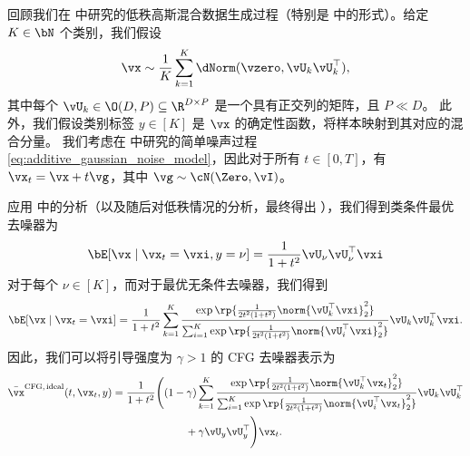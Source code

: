 \documentclass[../../book-main_zh.tex]{subfiles}
\begin{document}
\begin{example}\label{example:denoising-gaussian-mixture-cfg}
    回顾我们在  中研究的低秩高斯混合数据生成过程（特别是  中的形式）。给定 $K \in \bN$ 个类别，我们假设
    \begin{equation}\label{eq:MoG1-ch6}
        \vx \sim \frac{1}{K}\sum_{k = 1}^{K}\dNorm(\vzero,
        \vU_{k}\vU_{k}^{\top}),
    \end{equation}
    其中每个 \(\vU_{k} \in \O(D, P) \subseteq \R^{D \times P}\) 是一个具有正交列的矩阵，且 $P \ll D$。
    此外，我们假设类别标签 $y \in [K]$ 是 $\vx$ 的确定性函数，将样本映射到其对应的混合分量。
    我们考虑在  中研究的简单噪声过程 \eqref{eq:additive_gaussian_noise_model}，因此对于所有 $t \in [0, T]$，有 $\vx_t = \vx + t \vg$，其中 $\vg \sim \cN(\Zero, \vI)$。

    应用  中的分析（以及随后对低秩情况的分析，最终得出 ），我们得到类条件最优去噪器为
    \begin{equation}\label{eq:gmm_lowrank_denoiser-ch6-classcond}
        \bE[ \vx \mid \vx_t = \vxi, y = \nu ]
        = \frac{1}{1 + t^{2}}
        \vU_{\nu}\vU_{\nu}^{\top}\vxi
    \end{equation}
    对于每个 $\nu \in [K]$，而对于最优无条件去噪器，我们得到
    \begin{equation}\label{eq:gmm_lowrank_denoiser-ch6-uncond}
        \bE[ \vx \mid \vx_t = \vxi ]
        = \frac{1}{1 + t^{2}}\sum_{k =
        1}^{K}\frac{\exp\rp{\frac{1}{2t^{2}(1 +
        t^{2})}\norm{\vU_{k}^{\top}\vxi}_{2}^{2}}}{\sum_{i =
            1}^{K}\exp\rp{\frac{1}{2t^{2}(1 +
        t^{2})}\norm{\vU_{i}^{\top}\vxi}_{2}^{2}}}\vU_{k}\vU_{k}^{\top}\vxi.
    \end{equation}
    因此，我们可以将引导强度为 $\gamma > 1$ 的 CFG 去噪器表示为
    \begin{equation}\label{eq:cfg-denoiser-mog-low-rank}
        \begin{split}
            \bar{\vx}^{\mathrm{CFG,\,ideal}}(t, \vx_t, y)
            =
            \frac{1}{1 + t^{2}}
            \Biggl(
                &(1 - \gamma)
                \sum_{k = 1}^{K}\frac{\exp\rp{\frac{1}{2t^{2}(1
                + t^{2})}\norm{\vU_{k}^{\top}\vx_t}_{2}^{2}}}{\sum_{i
                    = 1}^{K}\exp\rp{\frac{1}{2t^{2}(1
                                +
                t^{2})}\norm{\vU_{i}^{\top}\vx_t}_{2}^{2}}}\vU_{k}\vU_{k}^{\top}
                \\
                &\qquad+
                \gamma
                \vU_{y}\vU_{y}^{\top}
            \Biggr)
            \vx_t.
        \end{split}
    \end{equation}


\end{example}
\end{document}
